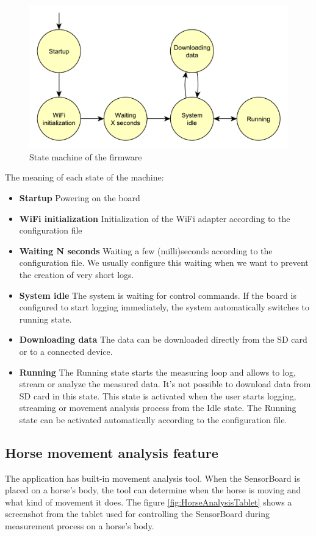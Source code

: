\begin{figure}
    \centering
    \label{firmwareStateMachine}
    \caption{State machine of the firmware}
    \includegraphics[width=\linewidth]{img/firmwareStateMachine.pdf}
\end{figure}

The meaning of each state of the machine:
\begin{itemize}
    \item \textbf{Startup} Powering on the board
    \item \textbf{WiFi initialization} Initialization of the WiFi adapter according to the configuration file
    \item \textbf{Waiting N seconds} Waiting a few (milli)seconds according to the configuration file. We usually configure this waiting when we want to prevent the creation of very short logs.
    \item \textbf{System idle} The system is waiting for control commands. If the board is configured to start logging immediately, the system automatically switches to running state.
    \item \textbf{Downloading data} The data can be downloaded directly from the SD card or to a connected device.
    \item \textbf{Running} The Running state starts the measuring loop and allows to log, stream or analyze the measured data. It's not possible to download data from SD card in this state. This state is activated when the user starts logging, streaming or movement analysis process from the Idle state. The Running state can be activated automatically according to the configuration file.
\end{itemize}

\subsection{Horse movement analysis feature}
The application has built-in movement analysis tool. When the SensorBoard is placed on a horse's body, the tool can determine when the horse is moving and what kind of movement it does. The figure \ref{fig:HorseAnalysisTablet} shows a screenshot from the tablet used for controlling the SensorBoard during measurement process on a horse's body.

